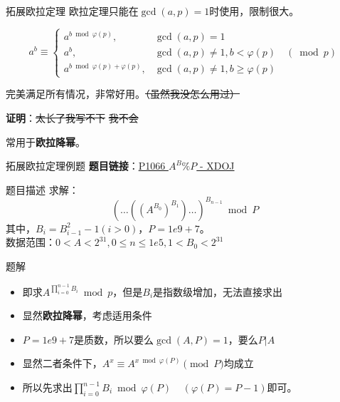 \begin{frame}[fragile]{拓展欧拉定理}
  欧拉定理只能在$\gcd(a,p)=1$时使用，限制很大。
  \pause
  \begin{theorem}[拓展欧拉定理]
    \begin{equation*}
      a^{b} \equiv\left\{\begin{array}{ll}
      a^{b \bmod \varphi(p)}, & \operatorname{gcd}(a, p)=1 \\
      a^{b}, & \operatorname{gcd}(a, p) \neq 1, b<\varphi(p) \quad(\bmod p) \\
      a^{b \bmod \varphi(p)+\varphi(p)}, & \operatorname{gcd}(a, p) \neq 1, b \geq \varphi(p)
      \end{array}\right.
    \end{equation*}
  \end{theorem}

  \pause 
  \vspace{0.3cm}
  完美满足所有情况，非常好用。\sout{（虽然我没怎么用过）}
  
  \pause
  \vspace{0.3cm}
  \textbf{证明}：\sout{太长了我写不下}\hspace{0.3cm} \sout{我不会}

  \pause 
  \vspace{0.3cm}
  常用于\textbf{欧拉降幂}。

\end{frame}

\begin{frame}[fragile]{拓展欧拉定理}{例题}
  \textbf{题目链接}：\href{https://acm.xidian.edu.cn/problem.php?id=1066}{P1066 $A^B\%P$ - XDOJ}
  \begin{block}{题目描述}
    求解：
    $$
    (\dots ((A^{B_0})^{B_1})\dots)^{B_{n-1}}\bmod{P}
    $$
    其中，$B_i=B_{i-1}^2-1(i>0)$，$P=1e9+7$。\\
    数据范围：$0<A<2^{31},0\le n\le 1e5,1<B_0<2^{31}$
  \end{block}
  \pause
  \begin{exampleblock}{题解}
    \begin{itemize}
      \item 即求$A^{\prod\limits_{i=0}^{n-1}B_i}\bmod{p}$，但是$B_i$是指数级增加，无法直接求出
      \pause 
      \item 显然\textbf{欧拉降幂}，考虑适用条件
      \item $P=1e9+7$是质数，所以要么$\gcd(A,P)=1$，要么$P|A$
      \pause 
      \item 显然二者条件下，$A^{x}\equiv A^{x\bmod \varphi(P)} \pmod{P}$均成立
      \item 所以先求出$\prod\limits_{i=0}^{n-1}B_i\bmod{\varphi(P)}\;\;\;\;(\varphi(P)=P-1)$即可。
    \end{itemize}
  \end{exampleblock}
\end{frame}